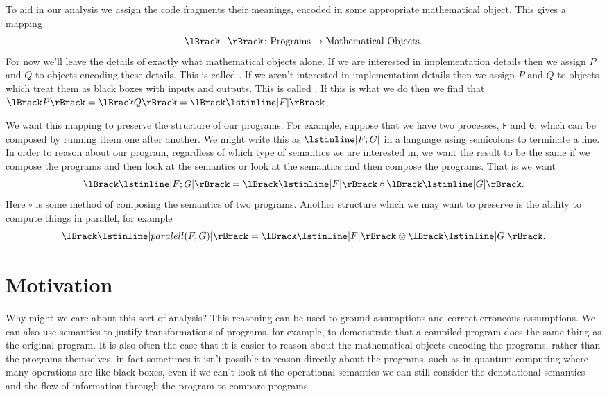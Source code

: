 \documentclass[fleqn]{NotesClass}
\DeclarePairedDelimiter{\denotes}{\lBrack}{\rBrack}
\begin{document}
    To aid in our analysis we assign the code fragments their meanings, encoded in some appropriate mathematical object.
    This gives a mapping
    \begin{equation}
        \denotes{-} \colon \text{Programs} \to \text{Mathematical Objects}.
    \end{equation}
    For now we'll leave the details of exactly what mathematical objects alone.
    If we are interested in implementation details then we assign \(P\) and \(Q\) to objects encoding these details.
    This is called .
    If we aren't interested in implementation details then we assign \(P\) and \(Q\) to objects which treat them as black boxes with inputs and outputs.
    This is called .
    If this is what we do then we find that \(\denotes{P} = \denotes{Q} = \denotes{\lstinline|F|}\).
    
    We want this mapping to preserve the structure of our programs.
    For example, suppose that we have two processes, \lstinline|F| and \lstinline|G|, which can be composed by running them one after another.
    We might write this as \(\lstinline|F; G|\) in a language using semicolons to terminate a line.
    In order to reason about our program, regardless of which type of semantics we are interested in, we want the result to be the same if we compose the programs and then look at the semantics or look at the semantics and then compose the programs.
    That is we want
    \begin{equation}
        \denotes{\lstinline|F; G|} = \denotes{\lstinline|F|} \circ \denotes{\lstinline|G|}.
    \end{equation}
    Here \(\circ\) is some method of composing the semantics of two programs.
    Another structure which we may want to preserve is the ability to compute things in parallel, for example
    \begin{equation}
        \denotes{\lstinline|paralell(F, G)|} = \denotes{\lstinline|F|} \otimes \denotes{\lstinline|G|}.
    \end{equation}
    
    \section{Motivation}
    Why might we care about this sort of analysis?
    This reasoning can be used to ground assumptions and correct erroneous assumptions.
    We can also use semantics to justify transformations of programs, for example, to demonstrate that a compiled program does the same thing as the original program.
    It is also often the case that it is easier to reason about the mathematical objects encoding the programs, rather than the programs themselves, in fact sometimes it isn't possible to reason directly about the programs, such as in quantum computing where many operations are like black boxes, even if we can't look at the operational semantics we can still consider the denotational semantics and the flow of information through the program to compare programs.
    
\end{document}
